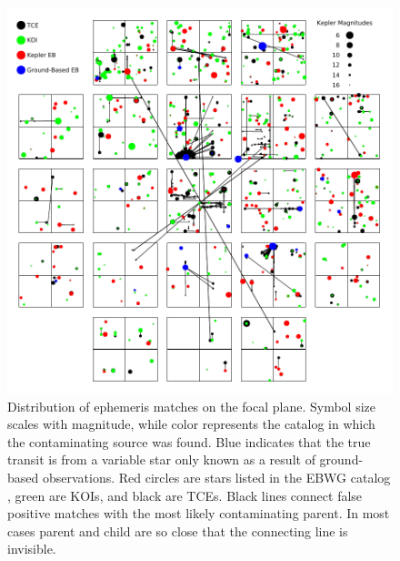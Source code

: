 \begin{figure}[ht]
\centering
\includegraphics[width=\linewidth]{CCDPlot.pdf}
\caption{Distribution of ephemeris matches on the focal plane. Symbol size scales with magnitude, while color represents the catalog in which the contaminating source was found. Blue indicates that the true transit is from a variable star only known as a result of ground-based observations. Red circles are stars listed in the \kepler{} EBWG catalog \citep[][\url{http://keplerebs.villanova.edu/}]{Kirk2016}, green are KOIs, and black are TCEs. Black lines connect false positive matches with the most likely contaminating parent. In most cases parent and child are so close that the connecting line is invisible.}
\label{ephemmatchfig}
\end{figure}


